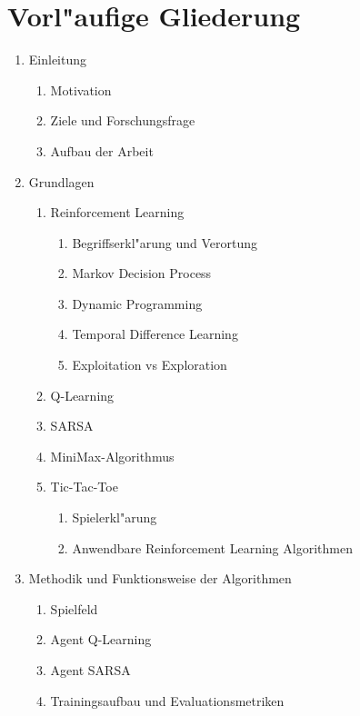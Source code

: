 \pagebreak
\section*{Vorl"aufige Gliederung}
\renewcommand{\labelenumii}{\arabic{enumi}.\arabic{enumii}}
\renewcommand{\labelenumiii}{\arabic{enumi}.\arabic{enumii}.\arabic{enumiii}}
\begin{enumerate}
    \item Einleitung
        \begin{enumerate}
        \item Motivation
        \item Ziele und Forschungsfrage
        \item Aufbau der Arbeit
        \end{enumerate}
    \item Grundlagen
        \begin{enumerate}
        \item Reinforcement Learning
            \begin{enumerate}
            \item Begriffserkl"arung und Verortung
            \item Markov Decision Process
            \item Dynamic Programming
            \item Temporal Difference Learning
            \item Exploitation vs Exploration
            \end{enumerate}
        \item Q-Learning
        \item SARSA      
        \item MiniMax-Algorithmus
        \item Tic-Tac-Toe
            \begin{enumerate}
            \item Spielerkl"arung
            \item Anwendbare Reinforcement Learning Algorithmen
            \end{enumerate}
        \end{enumerate}
    \item Methodik und Funktionsweise der Algorithmen
        \begin{enumerate}
        \item Spielfeld
        \item Agent Q-Learning
        \item Agent SARSA
        \item Trainingsaufbau und Evaluationsmetriken

\end{enumerate}
\end{enumerate}
